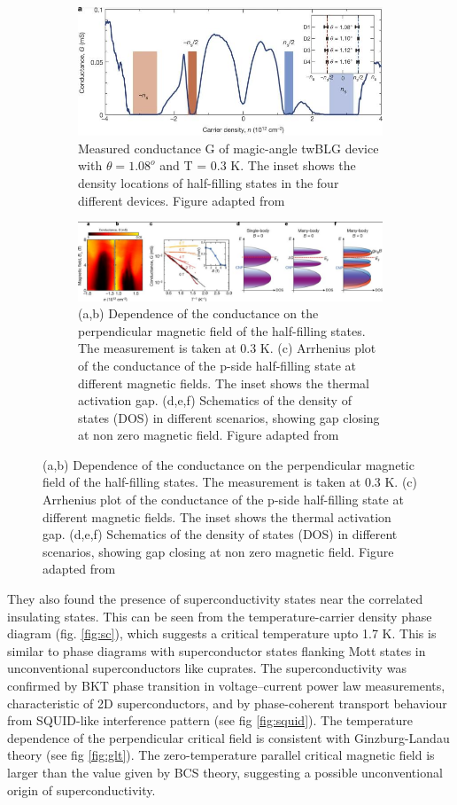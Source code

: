 \begin{figure}[H]
	\begin{subfigure}{\linewidth}
		\centering
		\includegraphics[width=\textwidth]{figures/ins.jpg}
		\caption{Measured conductance G of magic-angle twBLG device with $\theta=1.08^o$ and T = 0.3 K. The inset shows the density locations of half-filling states in the four different devices. Figure adapted from \cite{Cao2018}}
		\label{fig:ins}
	\end{subfigure}
	\begin{subfigure}{\linewidth}
		\centering
		\includegraphics[width=\textwidth]{figures/mag.jpg}
		\caption{(a,b) Dependence of the conductance on the perpendicular magnetic field of the half-filling states. The measurement is taken at 0.3 K. (c) Arrhenius plot of the conductance of the p-side half-filling state at different magnetic fields. The inset shows the thermal activation gap. (d,e,f) Schematics of the density of states (DOS) in different scenarios, showing gap closing at non zero magnetic field. Figure adapted from \cite{Cao2018}}
		\label{fig:mag}
	\end{subfigure}
\end{figure}

They also found the presence of superconductivity states near the correlated insulating states. This can be seen from the temperature-carrier density phase diagram (fig. \ref{fig:sc}), which suggests a critical temperature upto 1.7 K. \cite{Cao2018_2} This is similar to phase diagrams with
superconductor states flanking Mott states in unconventional superconductors like cuprates. The superconductivity was confirmed by BKT phase transition in voltage–current power law
measurements, characteristic of 2D superconductors, and by phase-coherent transport behaviour from SQUID-like interference pattern (see fig \ref{fig:squid}). The temperature dependence of the perpendicular critical field is consistent with Ginzburg-Landau theory (see fig \ref{fig:glt}). The zero-temperature parallel critical magnetic field is larger than the value given by BCS theory, suggesting a possible unconventional origin of superconductivity.

